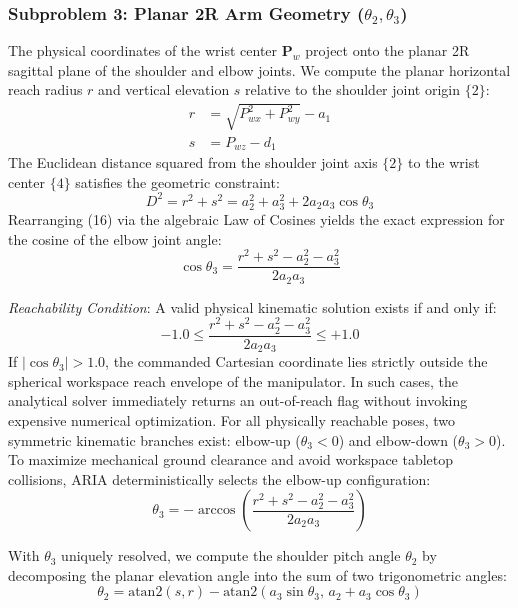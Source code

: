 \documentclass[journal]{IEEEtran}
\begin{document}
\subsubsection{Subproblem 3: Planar 2R Arm Geometry ($\theta_2, \theta_3$)}
The physical coordinates of the wrist center $\mathbf{P}_w$ project onto the planar 2R sagittal plane of the shoulder and elbow joints. We compute the planar horizontal reach radius $r$ and vertical elevation $s$ relative to the shoulder joint origin $\{2\}$:
\begin{align}
r &= \sqrt{P_{wx}^2 + P_{wy}^2} - a_1 \\
s &= P_{wz} - d_1
\end{align}
The Euclidean distance squared from the shoulder joint axis $\{2\}$ to the wrist center $\{4\}$ satisfies the geometric constraint:
\begin{equation}
D^2 = r^2 + s^2 = a_2^2 + a_3^2 + 2 a_2 a_3 \cos\theta_3
\end{equation}
Rearranging (16) via the algebraic Law of Cosines yields the exact expression for the cosine of the elbow joint angle:
\begin{equation}
\cos\theta_3 = \frac{r^2 + s^2 - a_2^2 - a_3^2}{2 a_2 a_3}
\end{equation}

\textit{Reachability Condition}: A valid physical kinematic solution exists if and only if:
\begin{equation}
-1.0 \le \frac{r^2 + s^2 - a_2^2 - a_3^2}{2 a_2 a_3} \le +1.0
\end{equation}
If $|\cos\theta_3| > 1.0$, the commanded Cartesian coordinate lies strictly outside the spherical workspace reach envelope of the manipulator. In such cases, the analytical solver immediately returns an out-of-reach flag without invoking expensive numerical optimization. For all physically reachable poses, two symmetric kinematic branches exist: elbow-up ($\theta_3 < 0$) and elbow-down ($\theta_3 > 0$). To maximize mechanical ground clearance and avoid workspace tabletop collisions, ARIA deterministically selects the elbow-up configuration:
\begin{equation}
\theta_3 = -\arccos\left( \frac{r^2 + s^2 - a_2^2 - a_3^2}{2 a_2 a_3} \right)
\end{equation}

With $\theta_3$ uniquely resolved, we compute the shoulder pitch angle $\theta_2$ by decomposing the planar elevation angle into the sum of two trigonometric angles:
\begin{equation}
\theta_2 = \text{atan2}(s, r) - \text{atan2}\left(a_3 \sin\theta_3, \, a_2 + a_3 \cos\theta_3\right)
\end{equation}
\end{document}
